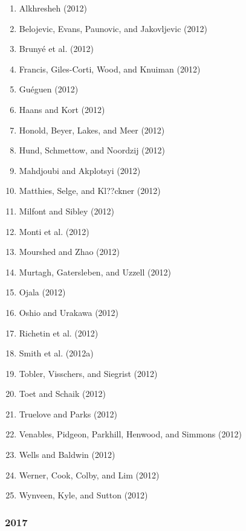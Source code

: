\documentclass[english,man]{apa6}
\providecommand{\tightlist}{%
  \setlength{\itemsep}{0pt}\setlength{\parskip}{0pt}}
\theoremstyle{definition}
\theoremstyle{definition}
\theoremstyle{definition}
\theoremstyle{remark}
\begin{document}
\begin{enumerate}
\def\labelenumi{\arabic{enumi})}
\tightlist
\item
  Alkhresheh (2012)
\item
  Belojevic, Evans, Paunovic, and Jakovljevic (2012)
\item
  Brunyé et al. (2012)
\item
  Francis, Giles-Corti, Wood, and Knuiman (2012)
\item
  Guéguen (2012)
\item
  Haans and Kort (2012)
\item
  Honold, Beyer, Lakes, and Meer (2012)
\item
  Hund, Schmettow, and Noordzij (2012)
\item
  Mahdjoubi and Akplotsyi (2012)
\item
  Matthies, Selge, and Kl??ckner (2012)
\item
  Milfont and Sibley (2012)
\item
  Monti et al. (2012)
\item
  Mourshed and Zhao (2012)
\item
  Murtagh, Gatersleben, and Uzzell (2012)
\item
  Ojala (2012)
\item
  Oshio and Urakawa (2012)
\item
  Richetin et al. (2012)
\item
  Smith et al. (2012a)
\item
  Tobler, Visschers, and Siegrist (2012)
\item
  Toet and Schaik (2012)
\item
  Truelove and Parks (2012)
\item
  Venables, Pidgeon, Parkhill, Henwood, and Simmons (2012)
\item
  Wells and Baldwin (2012)
\item
  Werner, Cook, Colby, and Lim (2012)
\item
  Wynveen, Kyle, and Sutton (2012)
\end{enumerate}

\subsubsection{2017}\label{section-23}
\end{document}
